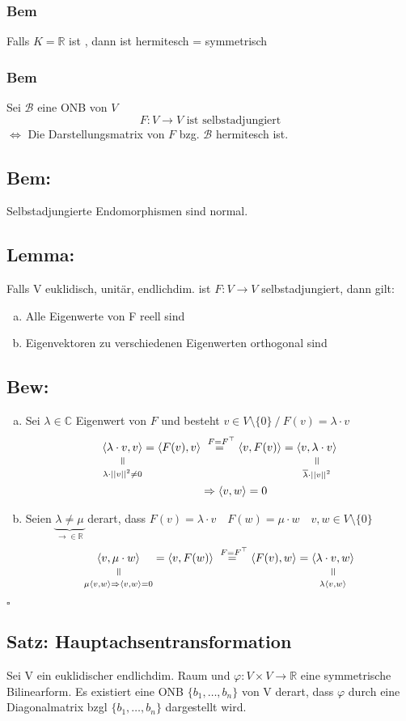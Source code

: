 \documentclass[titlepage,12pt,a4paper,ngerman]{report}
\newenvironment{bew}{\subsection{Bew:}}{\hfill$\square$}
\newcommand{\Bew}[1]{\begin{bew}#1\end{bew}}
\newcommand{\verteq}{\rotatebox{90}{$\,=$}}
\newcommand{\equalto}[2]{\underset{\scriptstyle\overset{\mkern4mu\verteq}{#2}}{#1}}
\newcommand{\tx}[1]{\textrm{#1}}
\newcommand{\basis}[3]{\{#1_{#2}, \dots, #1_{#3}\}}
\newcommand{\ska}[2]{\langle #1 , #2 \rangle}
\begin{document}
\subsubsection{Bem}
Falls $K = \mathbb R$ ist , dann ist hermitesch = symmetrisch
\subsubsection{Bem}
Sei $\mathcal B$ eine ONB von $V$
$$F: V \to V \tx{ ist selbstadjungiert}$$
$\Leftrightarrow$ Die Darstellungsmatrix von $F$ bzg. $\mathcal B$ hermitesch ist.

\subsection{Bem:}
Selbstadjungierte Endomorphismen sind normal.
\subsection{Lemma:}
Falls V euklidisch, unitär, endlichdim. ist $ F: V\to V $ selbstadjungiert, dann gilt:
\begin{enumerate}[a)]
	\item Alle Eigenwerte von F reell sind
	\item Eigenvektoren zu verschiedenen Eigenwerten orthogonal sind
\end{enumerate}

\Bew{
\begin{enumerate}[a)]
	\item Sei $\lambda \in \mathbb C$ Eigenwert von $F$ und besteht $v \in V \setminus \{0\}\ / \ F(v) = \lambda \cdot v$
	\begin{align*}
 		\equalto{\ska{\lambda \cdot v}{v}}{\lambda \cdot ||v||^2 \neq 0} = \ska{F(v)}{v}& \buildrel{\ F = F^\top} \over = \ska{v}{F(v)} = \equalto{\ska{v}{\lambda \cdot v}}{\overline{\lambda} \cdot ||v||^2}\\
 		&\Rightarrow \ska{v}{w} = 0
	\end{align*}
	\item Seien $\underbrace{\lambda \neq \mu}_{\rightarrow \in \mathbb R}$ derart, dass $F(v) = \lambda \cdot v \quad F(w) = \mu \cdot w \quad v,w \in V \setminus \{0\}$
	$$\equalto{\ska{v}{\mu \cdot w}}{\mu \ska{v}{w} \Rightarrow \ska{v}{w} = 0} = \ska{v}{F(w)} \buildrel{\ F = F^\top} \over = \ska{F(v)}{w}= \equalto{\ska{\lambda \cdot v}{w}}{\lambda \ska{v}{w}}$$
\end{enumerate}}

\subsection{Satz: Hauptachsentransformation}
Sei V ein euklidischer endlichdim. Raum und $ \varphi: V \times V \to \mathbb{R} $ eine symmetrische Bilinearform. Es existiert eine ONB  $ \basis{b}{1}{n} $ von V derart, dass $ \varphi $ durch eine Diagonalmatrix bzgl $ \basis{b}{1}{n} $ dargestellt wird.
\end{document}
